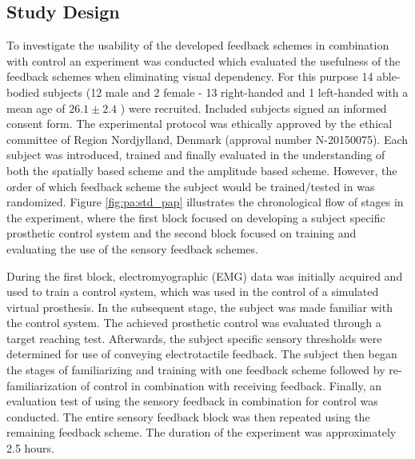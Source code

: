 \subsection{Study Design}

To investigate the usability of the developed feedback schemes in combination with control an experiment was conducted which evaluated the usefulness of the feedback schemes when eliminating visual dependency. For this purpose 14 able-bodied subjects (12 male and 2 female - 13 right-handed and 1 left-handed with a mean age of $26.1 \pm 2.4$ ) were recruited. Included subjects signed an informed consent form. The experimental protocol was ethically approved by the ethical committee of Region Nordjylland, Denmark (approval number N-20150075). Each subject was introduced, trained and finally evaluated in the understanding of both the spatially based scheme and the amplitude based scheme. However, the order of which feedback scheme the subject would be trained/tested in was randomized. Figure \ref{fig:pa:std_pap} illustrates the chronological flow of stages in the experiment, where the first block focused on developing a subject specific prosthetic control system and the second block focused on training and evaluating the use of the sensory feedback schemes. 

During the first block, electromyographic (EMG) data was initially acquired and used to train a control system, which was used in the control of a simulated virtual prosthesis. In the subsequent stage, the subject was made familiar with the control system. The achieved prosthetic control was evaluated through a target reaching test. Afterwards, the subject specific sensory thresholds were determined for use of conveying electrotactile feedback. The subject then began the stages of familiarizing and training with one feedback scheme followed by re-familiarization of control in combination with receiving feedback. Finally, an evaluation test of using the sensory feedback in combination for control was conducted. The entire sensory feedback block was then repeated using the remaining feedback scheme. The duration of the experiment was approximately 2.5 hours.  

